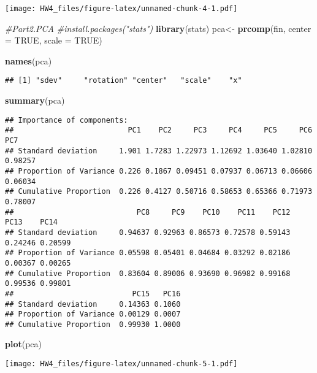 \documentclass[
]{article}
\newenvironment{Shaded}{\begin{snugshade}}{\end{snugshade}}
\newcommand{\AttributeTok}[1]{\textcolor[rgb]{0.13,0.29,0.53}{#1}}
\newcommand{\CommentTok}[1]{\textcolor[rgb]{0.56,0.35,0.01}{\textit{#1}}}
\newcommand{\ConstantTok}[1]{\textcolor[rgb]{0.56,0.35,0.01}{#1}}
\newcommand{\FunctionTok}[1]{\textcolor[rgb]{0.13,0.29,0.53}{\textbf{#1}}}
\newcommand{\NormalTok}[1]{#1}
\newcommand{\OtherTok}[1]{\textcolor[rgb]{0.56,0.35,0.01}{#1}}
\begin{document}
\texttt{[image: HW4\_files/figure-latex/unnamed-chunk-4-1.pdf]}

\begin{Shaded}
\begin{Highlighting}[]
\CommentTok{\#Part2.PCA}
\CommentTok{\#install.packages("stats")}
\FunctionTok{library}\NormalTok{(stats)}
\NormalTok{pca}\OtherTok{\textless{}{-}} \FunctionTok{prcomp}\NormalTok{(fin, }\AttributeTok{center =} \ConstantTok{TRUE}\NormalTok{, }\AttributeTok{scale =} \ConstantTok{TRUE}\NormalTok{)}

\FunctionTok{names}\NormalTok{(pca) }
\end{Highlighting}
\end{Shaded}

\begin{verbatim}
## [1] "sdev"     "rotation" "center"   "scale"    "x"
\end{verbatim}

\begin{Shaded}
\begin{Highlighting}[]
\FunctionTok{summary}\NormalTok{(pca)}
\end{Highlighting}
\end{Shaded}

\begin{verbatim}
## Importance of components:
##                          PC1    PC2     PC3     PC4     PC5     PC6     PC7
## Standard deviation     1.901 1.7283 1.22973 1.12692 1.03640 1.02810 0.98257
## Proportion of Variance 0.226 0.1867 0.09451 0.07937 0.06713 0.06606 0.06034
## Cumulative Proportion  0.226 0.4127 0.50716 0.58653 0.65366 0.71973 0.78007
##                            PC8     PC9    PC10    PC11    PC12    PC13    PC14
## Standard deviation     0.94637 0.92963 0.86573 0.72578 0.59143 0.24246 0.20599
## Proportion of Variance 0.05598 0.05401 0.04684 0.03292 0.02186 0.00367 0.00265
## Cumulative Proportion  0.83604 0.89006 0.93690 0.96982 0.99168 0.99536 0.99801
##                           PC15   PC16
## Standard deviation     0.14363 0.1060
## Proportion of Variance 0.00129 0.0007
## Cumulative Proportion  0.99930 1.0000
\end{verbatim}

\begin{Shaded}
\begin{Highlighting}[]
\FunctionTok{plot}\NormalTok{(pca) }
\end{Highlighting}
\end{Shaded}

\texttt{[image: HW4\_files/figure-latex/unnamed-chunk-5-1.pdf]}
\end{document}
